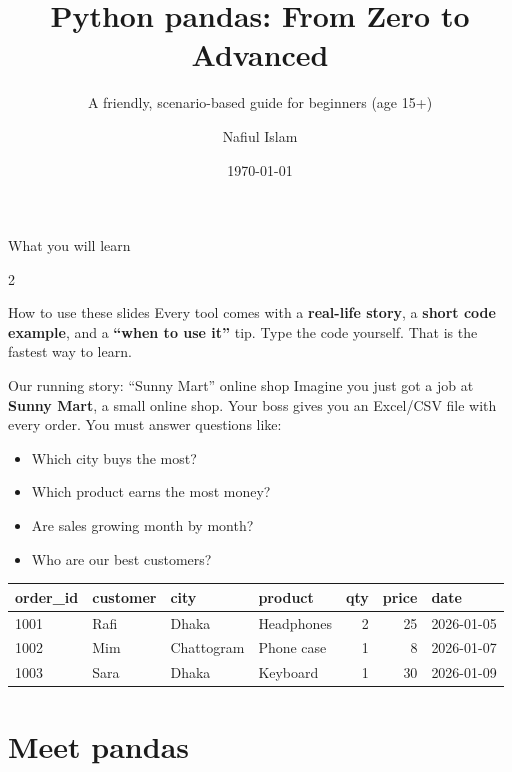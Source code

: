 \documentclass[aspectratio=169,10pt]{beamer}
\title[Python pandas]{Python pandas: From Zero to Advanced}
\subtitle{A friendly, scenario-based guide for beginners (age 15+)}
\author{Nafiul Islam}
\institute{BSDS, United International University}
\date{\today}
\begin{document}
\begin{frame}[plain]
  \titlepage
\end{frame}

\begin{frame}{What you will learn}
  \begin{multicols}{2}
  \tableofcontents[hideallsubsections]
  \end{multicols}
  \begin{block}{How to use these slides}
    Every tool comes with a \textbf{real-life story}, a \textbf{short code example}, and a
    \textbf{``when to use it''} tip. Type the code yourself. That is the fastest way to learn.
  \end{block}
\end{frame}

\begin{frame}{Our running story: ``Sunny Mart'' online shop}
  Imagine you just got a job at \textbf{Sunny Mart}, a small online shop. Your boss gives you
  an Excel/CSV file with every order. You must answer questions like:
  \begin{itemize}
    \item Which city buys the most?
    \item Which product earns the most money?
    \item Are sales growing month by month?
    \item Who are our best customers?
  \end{itemize}
  \vspace{1mm}
  \begin{tabular}{@{}llllrrl@{}}
    \toprule
    \textbf{order\_id} & \textbf{customer} & \textbf{city} & \textbf{product} & \textbf{qty} & \textbf{price} & \textbf{date}\\
    \midrule
    1001 & Rafi & Dhaka & Headphones & 2 & 25 & 2026-01-05\\
    1002 & Mim & Chattogram & Phone case & 1 & 8 & 2026-01-07\\
    1003 & Sara & Dhaka & Keyboard & 1 & 30 & 2026-01-09\\
    \bottomrule
  \end{tabular}
\end{frame}

\section{Meet pandas}
\end{document}

